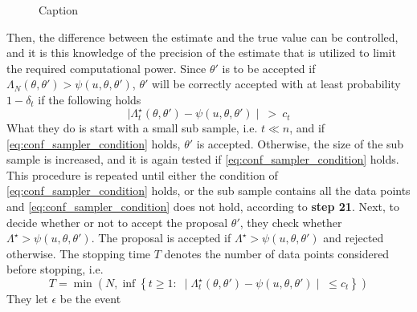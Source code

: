 {\begin{figure}[H]
    \caption{Caption}
    \label{fig:my_label}
\end{figure}{}
Then, the difference between the estimate and the true value can be controlled, and it is this knowledge of the precision of the estimate that is utilized to limit the required computational power.
Since $\theta'$ is to be accepted if $\Lambda_N\left(\theta, \theta'\right) > \psi\left(u, \theta, \theta'\right)$,  $\theta'$ will be correctly accepted with at least probability $1 - \delta_t$ if  the following holds 
\begin{equation}\label{eq:conf_sampler_condition}   \mid\Lambda_t^{\star}\left(\theta, \theta'\right) - \psi\left(u, \theta, \theta'\right)\mid \:>\: c_t
\end{equation}
What they do is start with a small sub sample, i.e. $t \ll n$, and if \eqref{eq:conf_sampler_condition} holds, $\theta'$ is accepted. 
Otherwise, the size of the sub sample is increased, and it is again tested if \eqref{eq:conf_sampler_condition} holds.
This procedure is repeated until either the condition of \eqref{eq:conf_sampler_condition} holds, or the sub sample contains all the data points and \eqref{eq:conf_sampler_condition} does not hold, according to \textbf{step 21}. 
Next, to decide whether or not to accept the proposal $\theta'$, 
they check whether $\Lambda^{\star} > \psi \left(u, \theta, \theta ' \right)$. 
The proposal is accepted if $\Lambda^{\star} >  \psi \left(u, \theta, \theta ' \right)$ and rejected otherwise.   
The stopping time $T$ denotes the number of data points considered before stopping, i.e. 
\begin{equation}\label{eq:T_stopping}
    T = \min\left(N, \inf\left\{t\geq 1 :\; \mid \Lambda_t^{\star}\left(\theta, \theta'\right) - \psi\left(u, \theta, \theta'\right)\mid \;\leq c_t\right\}\right)
\end{equation}
They let $\epsilon$ be the event

}
